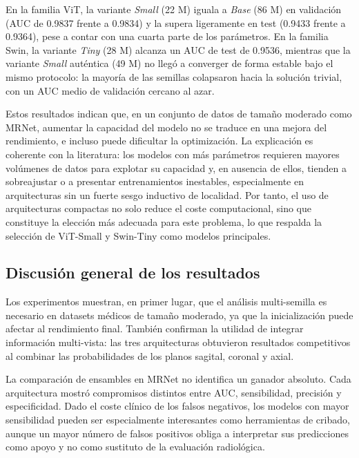 En la familia ViT, la variante \textit{Small} (22 M) iguala a \textit{Base} (86 M) en validación (AUC de 0.9837 frente a 0.9834) y la supera ligeramente en test (0.9433 frente a 0.9364), pese a contar con una cuarta parte de los parámetros. En la familia Swin, la variante \textit{Tiny} (28 M) alcanza un AUC de test de 0.9536, mientras que la variante \textit{Small} auténtica (49 M) no llegó a converger de forma estable bajo el mismo protocolo: la mayoría de las semillas colapsaron hacia la solución trivial, con un AUC medio de validación cercano al azar.

Estos resultados indican que, en un conjunto de datos de tamaño moderado como MRNet, aumentar la capacidad del modelo no se traduce en una mejora del rendimiento, e incluso puede dificultar la optimización. La explicación es coherente con la literatura: los modelos con más parámetros requieren mayores volúmenes de datos para explotar su capacidad y, en ausencia de ellos, tienden a sobreajustar o a presentar entrenamientos inestables, especialmente en arquitecturas sin un fuerte sesgo inductivo de localidad. Por tanto, el uso de arquitecturas compactas no solo reduce el coste computacional, sino que constituye la elección más adecuada para este problema, lo que respalda la selección de ViT-Small y Swin-Tiny como modelos principales.


\subsection{Discusión general de los resultados}
\label{subsec:discusion_general_resultados}

Los experimentos muestran, en primer lugar, que el análisis multi-semilla es necesario en datasets médicos de tamaño moderado, ya que la inicialización puede afectar al rendimiento final. También confirman la utilidad de integrar información multi-vista: las tres arquitecturas obtuvieron resultados competitivos al combinar las probabilidades de los planos sagital, coronal y axial.

La comparación de ensambles en MRNet no identifica un ganador absoluto. Cada arquitectura mostró compromisos distintos entre AUC, sensibilidad, precisión y especificidad. Dado el coste clínico de los falsos negativos, los modelos con mayor sensibilidad pueden ser especialmente interesantes como herramientas de cribado, aunque un mayor número de falsos positivos obliga a interpretar sus predicciones como apoyo y no como sustituto de la evaluación radiológica.

